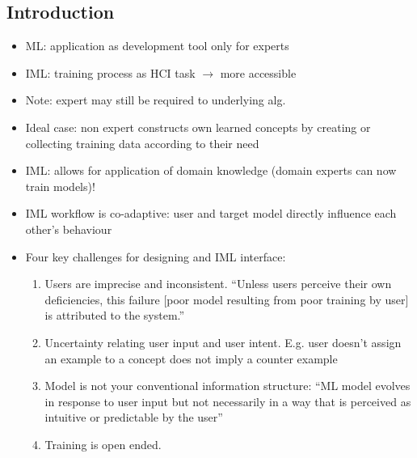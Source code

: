 \documentclass[12pt,a4paper]{article}
\begin{document}
\subsection{Introduction}
\begin{itemize}
\item ML: application as development tool only for experts
\item IML: training process as HCI task $\rightarrow$ more accessible
\item Note: expert may still be required to underlying alg.
\item Ideal case: non expert constructs own learned concepts by creating or collecting training data according to their need
\item IML: allows for application of domain knowledge (domain experts can now train models)!
\item IML workflow is co-adaptive: user and target model directly influence each other's behaviour
\item Four key challenges for designing and IML interface:
\begin{enumerate}
\item Users are imprecise and inconsistent. ``Unless users perceive their own deficiencies, this failure [poor model resulting from poor training by user] is attributed to the system.''
\item Uncertainty relating user input and user intent. E.g. user doesn't assign an example to a concept does not imply a counter example
\item Model is not your conventional information structure: ``ML model evolves in response to user input but not necessarily in a way that is perceived as intuitive or predictable by the user''
\item Training is open ended.
\end{enumerate}
\end{itemize}
\end{document}
